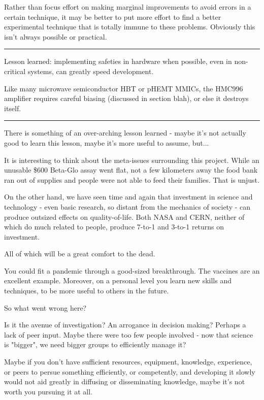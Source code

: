 \documentclass[paper.tex]{subfiles}
\begin{document}
Rather than focus effort on making marginal improvements to avoid errors in a certain technique, it may be better to put more effort to find a better experimental technique that is totally immune to these problems. Obviously this isn't always possible or practical.


\rule{\linewidth}{0.2pt}


Lesson learned: implementing safeties in hardware when possible, even in non-critical systems, can greatly speed development.

Like many microwave semiconductor HBT or pHEMT MMICs, the HMC996 amplifier requires careful biasing (discussed in section blah), or else it destroys itself. 






\rule{\linewidth}{0.2pt}


There is something of an over-arching lesson learned - maybe it's not actually good to learn this lesson, maybe it's more useful to assume, but...

It is interesting to think about the meta-issues surrounding this project. While an unusable \$600 Beta-Glo assay went flat, not a few kilometers away the food bank ran out of supplies and people were not able to feed their families. That is unjust. 

On the other hand, we have seen time and again that investment in science and technology - even basic research, so distant from the mechanics of society - can produce outsized effects on quality-of-life. Both NASA and CERN, neither of which do much related to people, produce 7-to-1 and 3-to-1 returns on investment. 

All of which will be a great comfort to the dead. 

You could fit a pandemic through a good-sized breakthrough. The vaccines are an excellent example. Moreover, on a personal level you learn new skills and techniques, to be more useful to others in the future.

So what went wrong here? 

Is it the avenue of investigation? An arrogance in decision making? Perhaps a lack of peer input. Maybe there were too few people involved - now that science is "bigger", we need bigger groups to efficiently manage it? 

Maybe if you don't have sufficient resources, equipment, knowledge, experience, or peers to persue something efficiently, or competently, and developing it slowly would not aid greatly in diffusing or disseminating knowledge, maybe it's not worth you pursuing it at all.
\end{document}

